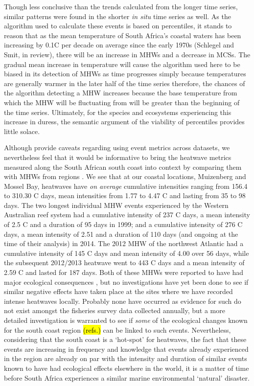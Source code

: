\documentclass[a4paper,10pt,review]{elsarticle}
\begin{document}
Though less conclusive than the trends calculated from the longer time series, similar patterns were found in the shorter \emph{in situ} time series as well. As the algorithm used to calculate these events is based on percentiles, it stands to reason that as the mean temperature of South Africa's coastal waters has been increasing by 0.1\degree C per decade on average since the early 1970s (Schlegel and Smit, in review), there will be an increase in MHWs and a decrease in MCSs. The gradual mean increase in temperature will cause the algorithm used here to be biased in its detection of MHWs as time progresses simply because temperatures are generally warmer in the later half of the time series therefore, the chances of the algorithm detecting a MHW increases because the base temperature from which the MHW will be fluctuating from will be greater than the beginning of the time series. Ultimately, for the species and ecosystems experiencing this increase in duress, the semantic argument of the viability of percentiles provides little solace.

Although \citet{Hobday2016} provide caveats regarding using event metrics across datasets, we nevertheless feel that it would be informative to bring the heatwave metrics measured along the South African south coast into context by comparing them with MHWs from regions \citep[see][]{Hobday2016}. We see that at our coastal locations, Muizenberg and Mossel Bay, heatwaves have \emph{on average} cumulative intensities ranging from 156.4 to 310.30 \degree C days, mean intensities from 1.77 to 4.47 \degree C and lasting from 35 to 98 days. The two longest individual MHW events experienced by the Western Australian reef system \citep{Feng2013} had a cumulative intensity of 237 \degree C days, a mean intensity of 2.5 \degree C and a duration of 95 days in 1999; and a cumulative intensity of 276 \degree C days, a mean intensity of 2.51 and a duration of 110 days (and ongoing at the time of their analysis) in 2014. The 2012 MHW of the northwest Atlantic \citep{Mills2012, Chen2014} had a cumulative intensity of 145 \degree C days and mean intensity of 4.00 \degree over 56 days, while the subsequent 2012/2013 heatwave went to 443 \degree C days and a mean intensity of 2.59 \degree C and lasted for 187 days. Both of these MHWs were reported to have had major ecological consequences \citep{Feng2013, Mills2012, Chen2014}, but no investigations have yet been done to see if similar negative effects have taken place at the sites where we have recorded intense heatwaves locally. Probably none have occurred as evidence for such do not exist amongst the fisheries survey data collected annually, but a more detailed investigation is warranted to see if \emph{some} of the ecological changes known for the south coast region \hl{(refs.)} can be linked to such events. Nevertheless, considering that the south coast is a `hot-spot' for heatwaves, the fact that these events are increasing in frequency and knowledge that events already experienced in the region are already on par with the intensity and duration of similar events known to have had ecological effects elsewhere in the world, it is a matter of time before South Africa experiences a similar marine environmental `natural' disaster.
\end{document}
